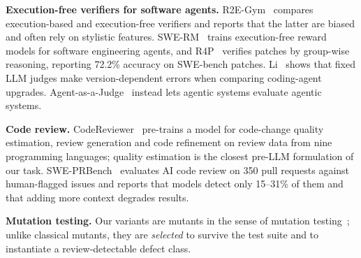 \textbf{Execution-free verifiers for software agents.}  R2E-Gym~\cite{jain2025r2egym}
compares execution-based and execution-free verifiers and reports that the
latter are biased and often rely on stylistic features.
SWE-RM~\cite{shum2025swerm} trains execution-free reward models for software
engineering agents, and R4P~\cite{xu2025r4p} verifies patches by group-wise
reasoning, reporting 72.2\% accuracy on SWE-bench patches.  Li~\cite{li2026frozen}
shows that fixed LLM judges make version-dependent errors when comparing
coding-agent upgrades.  Agent-as-a-Judge~\cite{zhuge2024agent} instead lets
agentic systems evaluate agentic systems.

\textbf{Code review.}  CodeReviewer~\cite{li2022codereviewer} pre-trains a model
for code-change quality estimation, review generation and code refinement on
review data from nine programming languages; quality estimation is the closest
pre-LLM formulation of our task.  SWE-PRBench~\cite{kumar2026sweprbench}
evaluates AI code review on 350 pull requests against human-flagged issues and
reports that models detect only 15--31\% of them and that adding more context
degrades results.

\textbf{Mutation testing.}  Our variants are mutants in the sense of mutation
testing~\cite{jia2011mutation}; unlike classical mutants, they are
\emph{selected} to survive the test suite and to instantiate a
review-detectable defect class.

